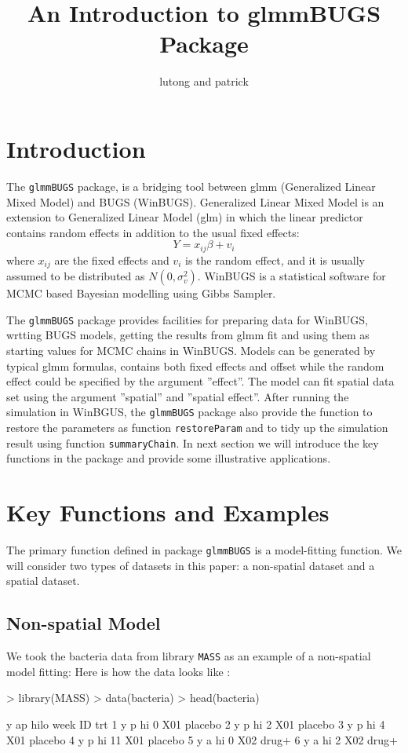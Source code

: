 \documentclass[a4paper]{report}
\begin{document}
\begin{article}
\title{An Introduction to glmmBUGS Package}
\author{lutong and patrick}
\maketitle

\section{Introduction}
The \verb!glmmBUGS! package, is a bridging tool between glmm (Generalized Linear Mixed Model) and BUGS (WinBUGS).
Generalized Linear Mixed Model is an extension to Generalized Linear Model (glm) in which the linear predictor contains random effects
in addition to the usual fixed effects:
\[Y = x_{ij}\beta + v_i\]
where $x_{ij}$ are the fixed effects and $v_i$ is the random effect, and it is usually assumed to be distributed as $N(0, \sigma_v^2)$.
WinBUGS is a statistical software for MCMC based Bayesian modelling using Gibbs Sampler.


The \verb!glmmBUGS! package provides facilities for preparing data for WinBUGS, wrtting BUGS models, getting the results from glmm fit and using them as starting values for MCMC chains in WinBUGS.
Models can be generated by typical glmm formulas, contains both fixed effects and offset while the random effect could be specified by the argument ''effect''.
The model can fit spatial data set using the argument ''spatial'' and ''spatial effect''.
After running the simulation in WinBGUS, the \verb!glmmBUGS! package also provide the function to restore the
parameters as function \verb!restoreParam! and to tidy up the simulation result using function \verb!summaryChain!.
In next section we will introduce the key functions in the package and provide some illustrative applications.

\section{Key Functions and Examples}
The primary function defined in package \verb!glmmBUGS! is a model-fitting function.
We will consider two types of datasets in this paper: a non-spatial dataset and a spatial dataset.

\subsection{Non-spatial Model} 
We took the bacteria data from library \verb!MASS! as an example of a non-spatial model fitting:
Here is how the data looks like : 
\begin{Schunk}
\begin{Sinput}
> library(MASS)
> data(bacteria)
> head(bacteria)
\end{Sinput}
\begin{Soutput}
  y ap hilo week  ID     trt
1 y  p   hi    0 X01 placebo
2 y  p   hi    2 X01 placebo
3 y  p   hi    4 X01 placebo
4 y  p   hi   11 X01 placebo
5 y  a   hi    0 X02   drug+
6 y  a   hi    2 X02   drug+
\end{Soutput}
\end{Schunk}


\end{article}
\end{document}
